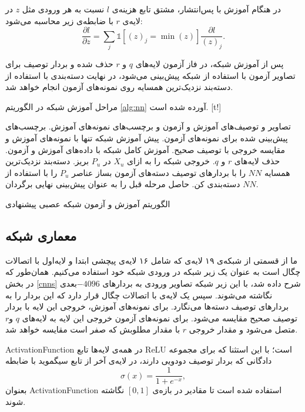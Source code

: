 در هنگام آموزش با پس‌انتشار، مشتق تابع هزینه‌ی $l$ نسبت به هر ورودی مثل $z$ در لایه‌ی $r$ با ضابطه‌ی زیر محاسبه می‌شود:
\begin{equation}
\label{eq:grad_min}
\frac{\partial l}{\partial z} = \sum_j \mathds{1}[(z)_j=\min(z)]  \frac{\partial l}{(z)_j}.
\end{equation}

پس از آموزش شبکه، در فاز آزمون لایه‌های $q$ و $r$ حذف شده و بردار توصیف برای تصاویر آزمون با استفاده از شبکه پیش‌بینی می‌شود، در نهایت دسته‌بندی با استفاده از دسته‌بند نزدیک‌ترین همسایه روی نمونه‌های آزمون انجام خواهد شد.

مراحل آموزش شبکه در الگوریتم \ref{alg:nn} آورده شده است.
[t!]
	\begin{enumerate}[label={\arabic*},itemsep=.1em, parsep=.1em]
 تصاویر و توصیف‌های آموزش و آزمون و برچسب‌های نمونه‌های آموزش.
 برچسب‌های پیش‌بینی شده برای نمونه‌های آزمون.
 پیش آموزش شبکه تنها با نمونه‌های آموزش و مقایسه خروجی با توصیف صحیح.
 آموزش کامل شبکه با داده‌های آموزش و آزمون.
 حذف لایه‌های $r$ و $q$.
 خروجی شبکه را به ازای $X_u$ در $P_u$ بریز.
 دسته‌بند نزدیک‌ترین همسایه $NN$ را با بردارهای توصیف دسته‌های آزمون بساز
 عناصر $P_u$ را با استفاده از $NN$ دسته‌بندی کن.
 حاصل مرحله قبل را به عنوان پیش‌بینی نهایی برگردان.
\end{enumerate}
\caption{الگوریتم آموزش و آزمون شبکه عصبی پیشنهادی}
\label{alg:nn}
\subsection{معماری شبکه}\label{net_architechture}
ما از قسمتی از شبکه‌ی ۱۹ لایه‌ی  \cite{vgg} که شامل ۱۶ لایه‌ی پیچشی ابتدا و لایه‌‌‌اول با اتصالات چگال است به عنوان یک زیر شبکه در ورودی شبکه خود استفاده می‌کنیم. همان‌طور که در بخش
\ref{cnns}
شرح داده شد،
 با این زیر شبکه تصاویر ورودی به بردارهای $-4096$بعدی نگاشته می‌شوند.
  سپس یک لایه‌ی با اتصالات چگال قرار دارد که این بردار را به بردارهای توصیف دسته‌ها می‌نگارد. برای نمونه‌های آموزش، خروجی این لایه با بردار توصیف صحیح مقایسه می‌شود. برای نمونه‌های آزمون خروجی این لایه به  لایه‌های  $q$ و$r$ متصل می‌شود و مقدار خروجی $r$ با مقدار مطلوبش که صفر است مقایسه خواهد شد.

\gls{ActivationFunction} در همه‌ی لایه‌ها تابع \gls{ReLU} است؛ با این استثنا که برای مجموعه‌ دادگانی که بردار توصیف دودویی دارند، در لایه‌ی آخر از تابع سیگموید با ضابطه
\begin{equation}
\sigma(x) = \frac{1}{1 + e^{-x}},
\end{equation}
بعنوان \gls{ActivationFunction} استفاده شده است تا مقادیر در بازه‌ی $[0,1]$ نگاشته شوند.

